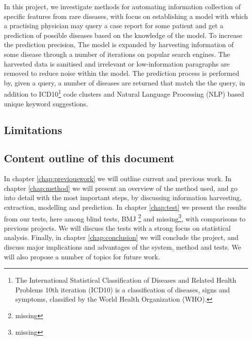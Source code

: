 \documentclass[10pt,letterpaper,final]{article}
\begin{document}
In this project, we investigate methods for automating information
collection of specific features from rare diseases, with focus on
establishing a model with which a practising physician may query a case
report for some patient and get a prediction of possible diseases based
on the knowledge of the model.
To increase the prediction precision, The model is expanded by
harvesting information of some disease through a number of iterations on
popular search engines. The harvested data is sanitised and irrelevant
or low-information paragraphs are removed to reduce noise within the
model. The prediction process is performed by, given a query, a number
of diseases are returned that match the the query, in addition to
ICD10\footnote{The International Statistical Classification of Diseases
and Related Health Problems 10th iteration (ICD10) is a classification
of diseases, signs and symptoms, classified by the World Health
Organization (WHO).} code clusters and Natural Language Processing (NLP)
based unique keyword suggestions. 





\subsection{Limitations}


\subsection{Content outline of this document}
In chapter \ref{chap:previouswork} we will outline current and previous
work.
In chapter \ref{chap:method} we will present an overview of the method
used, and go into detail with the most important steps, by discussing
information harvesting, extraction, modelling and prediction.
In chapter \ref{chap:test} we present the results from our tests, here
among blind tests, BMJ \footnote{missing} and missing\footnote{missing},
with comparisons to previous projects. We will discuss the tests with a
strong focus on statistical analysis.
Finally, in chapter \ref{chap:conclusion} we will conclude the project,
and discuss major implications and advantages of the system, method and
tests. We will also propose a number of topics for future work.
\end{document}
